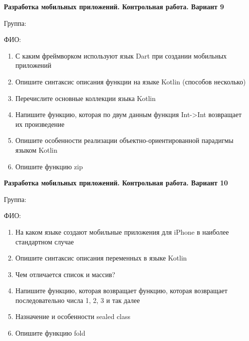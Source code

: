 \documentclass[12pt]{article}
\begin{document}
\newpage\begin{minipage}{\textwidth}
\textbf{Разработка мобильных приложений. Контрольная работа. Вариант 9}

Группа: \underline{\hspace{3cm}}

ФИО: \underline{\hspace{10cm}}

\begin{enumerate}
\item С каким фреймворком используют язык Dart при создании мобильных приложений
\item Опишите синтаксис описания функции на языке Kotlin (способов несколько)
\item Перечислите основные коллекции языка Kotlin
\item Напишите функцию, которая по двум данным функция Int->Int возвращает их произведение
\item Опишите особенности реализации объектно-ориентированной парадигмы языком Kotlin
\item Опишите функцию zip

\end{enumerate}
\end{minipage}

\newpage\begin{minipage}{\textwidth}
\textbf{Разработка мобильных приложений. Контрольная работа. Вариант 10}

Группа: \underline{\hspace{3cm}}

ФИО: \underline{\hspace{10cm}}

\begin{enumerate}
\item На каком языке создают мобильные приложения для iPhone в наиболее стандартном случае
\item Опишите синтаксис описания переменных в языке Kotlin
\item Чем отличается список и массив?
\item Напишите функцию, которая возвращает функцию, которая возвращает последовательно числа 1, 2, 3 и так далее
\item Назначение и особенности sealed class
\item Опишите функцию fold

\end{enumerate}
\end{minipage}

\newpage
\end{document}
